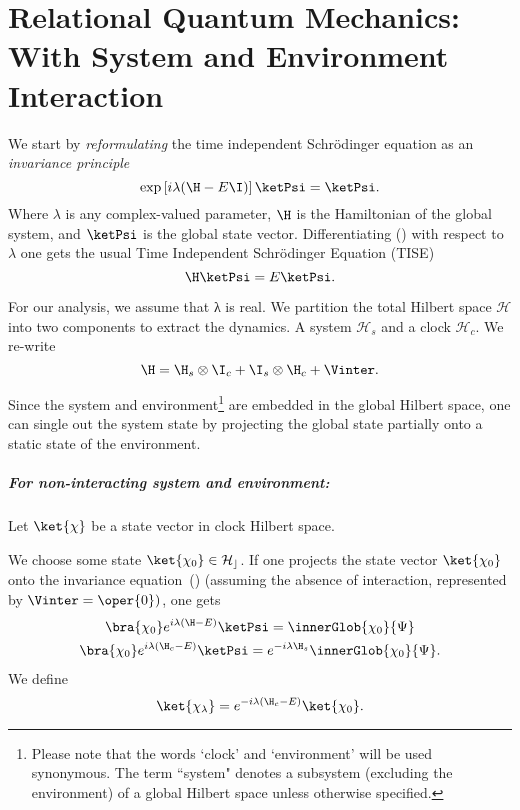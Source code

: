 \chapter[Quantum Relational Dynamics for Interacting Quantum Systems]{Relational Quantum Mechanics: With System and Environment Interaction\label{chap:sebgem_Rel}}

We start by \emph{reformulating} the time independent Schr\"odinger equation as an \emph{invariance principle}~\cite{Gemsheim:2023izg}
\begin{equation}
    \label{eq:invariance_principle}
        \exp\left[i\lambda(\H - E\I)\right] \ketPsi = \ketPsi. 
\end{equation}
Where  \(\lambda\) is any complex-valued parameter, $\H$ is the Hamiltonian of the global system, and \(\ketPsi\) is the global state vector. Differentiating () with respect to \(\lambda\) one gets  the usual Time Independent Schr\"odinger Equation (TISE)
\begin{equation*}
    \H \ketPsi = E \ketPsi.
\end{equation*}

For our analysis, we assume that λ is real. We partition the total Hilbert space $\mathcal{H}$ into two components to extract the dynamics. A system \(\mathcal{H}_s\) and a clock \(\mathcal{H}_c\). We re-write 
\begin{equation}
    \H = \H_s \otimes \I_c + \I_s \otimes \H_c + \Vinter .
\end{equation}

Since the system and environment\footnote{Please note that the words `clock' and `environment' will be used synonymous. The term ``system" denotes a subsystem (excluding the environment) of a global Hilbert space unless otherwise specified.} are embedded in the global Hilbert space, one can single
out the system state by projecting the global state partially onto a static state of the environment. 

\paragraph{For non-interacting system and environment:} Let \(\ket{\chi}\) be a state vector 
in clock Hilbert space. 

We choose some state \(\ket{\chi_0} \in \mathcal{H_c}\). If one projects the state vector \(\ket{\chi_0}\) onto the invariance equation~() (assuming the absence of interaction, represented by \(\Vinter = \oper{0})\), one gets
\begin{equation}
\begin{gathered}
\bra{\chi_0}e^{i\lambda(\H - E)}\ketPsi = \innerGlob{\chi_0}{\Psi}\\
\bra{\chi_0}e^{i\lambda(\H_c - E)}\ketPsi =e^{-i\lambda \H_s}  \innerGlob{\chi_0}{\Psi}.
\end{gathered}
\end{equation}
We define
\begin{equation}
   \ket{\chi_\lambda} = e^{-i\lambda(\H_c - E)}\ket{\chi_0}.
\end{equation}

